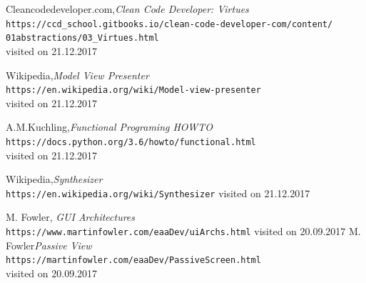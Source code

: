 \documentclass[margin,line,a4paper,authoryear,12pt]{report}
\begin{document}
\begin{thebibliography}{9}

Cleancodedeveloper.com,\textit{Clean Code Developer: Virtues}\\
\texttt{https://ccd\_school.gitbooks.io/clean-code-developer-com/content/\\01abstractions/03\_Virtues.html}\\visited on 21.12.2017 

Wikipedia,\textit{Model View Presenter}\\
\texttt{https://en.wikipedia.org/wiki/Model-view-presenter}\\
visited on 21.12.2017 

A.M.Kuchling,\textit{Functional Programing HOWTO}\\
\texttt{https://docs.python.org/3.6/howto/functional.html}\\
visited on 21.12.2017 


Wikipedia,\textit{Synthesizer}\\
\texttt{https://en.wikipedia.org/wiki/Synthesizer}
visited on 21.12.2017

M. Fowler, \textit{GUI Architectures}\\
\texttt{https://www.martinfowler.com/eaaDev/uiArchs.html}
visited on 20.09.2017
M. Fowler\textit{Passive View}\\
\texttt{https://martinfowler.com/eaaDev/PassiveScreen.html}\\
visited on 20.09.2017
\end{thebibliography}
\end{document}

